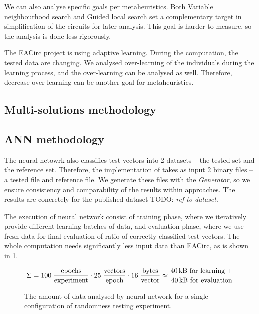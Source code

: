 \documentclass[
  print, %
  Table,   %
  nolof,     %
  nolot,     %
  11pt, %
  oneside  %
]{fithesis3}
\newcommand{\todo}[1]{TODO: \textit{#1}}
\begin{document}
We can also analyse specific goals per metaheuristics. Both Variable neighbourhood search and Guided local search set a complementary target in simplification of the circuits for later analysis. This goal is harder to measure, so the analysis is done less rigorously.

The EACirc project is using adaptive learning. During the computation, the tested data are changing. We analysed over-learning of the individuals during the learning process, and the over-learning can be analysed as well. Therefore, decrease over-learning can be another goal for metaheuristics.

\subsection{Multi-solutions methodology}
\label{subsec:method-spec-ms}

\subsection{ANN methodology}
\label{subsubsec:method-spec-ms-aco}


The neural netowrk also classifies test vectors into 2 datasets -- the tested set and the reference set. Therefore, the implementation of takes as input 2 binary files -- a tested file and reference file. We generate these files with the \textit{Generator}, so we ensure consistency and comparability of the results within approaches. The results are concretely for the published dataset \todo{ref to dataset}.

The execution of neural network consist of training phase, where we iteratively provide different learning batches of data, and evaluation phase, where we use fresh data for final evaluation of ratio of correctly classified test vectors. The whole computation needs significantly less input data than EACirc, as is shown in \cref{fig:ann-dataUsage}.

\begin{figure}[t]
    \begin{equation*}
        \begin{aligned}
    \Sigma = 
             100 \;
             \frac{\textnormal{epochs}}
                  {\textnormal{experiment}}
             \cdot
             25 \;
             \frac{\textnormal{vectors}}
                  {\textnormal{epoch}}
             \cdot
             16 \;
             \frac{\textnormal{bytes}}
                  {\textnormal{vector}}
             \approx {40 \textnormal{\,kB for learning +} \atop {40 \textnormal{\,kB for evaluation}}}
        \end{aligned}
    \end{equation*}
    \caption{The amount of data analysed by neural network for a single configuration of randomness testing experiment.}
    \label{fig:ann-dataUsage}
\end{figure}
\end{document}
